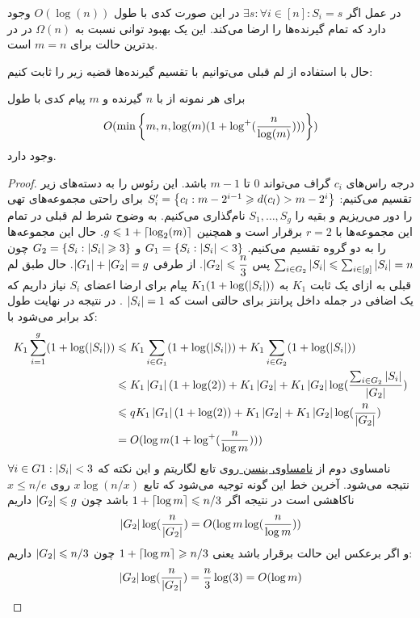 \begin{remark}
    در عمل اگر
    $\exists s: \forall i \in [n]: S_i = s$
    در این صورت کدی با طول
    $O(\log(n))$
    وجود دارد که تمام گیرنده‌ها را ارضا می‌کند. این یک بهبود توانی نسبت به
    $\Omega(n)$
    در
    \icod
    در بدترین حالت برای
    $m = n$
    است.
\end{remark}

حال با استفاده از لم قبلی می‌توانیم با تقسیم گیرنده‌ها قضیه زیر را ثابت کنیم:
\begin{theorem}
    \label{theorem:log1}
    برای هر نمونه از
    با
    $n$
    گیرنده و
    $m$
    پیام کدی با طول
    $$O(\min\left\{ m, n, \log(m)(1 + \log^{+}(\dfrac{n}{\log(m)}) )) \right\})$$
    وجود دارد.
\end{theorem}
\begin{proof}
    درجه راس‌های
    $c_i$
    گراف می‌تواند
    $0$
    تا
    $m - 1$
    باشد. این رئوس را به دسته‌های زیر تقسیم می‌کنیم:
    $S_{i}' = \left\{ c_l: m - 2^{i - 1} \geqslant d(c_l) > m - 2^i \right\}$
    برای راحتی مجموعه‌های تهی را دور می‌ریزیم و بقیه را
    $S_1, \ldots, S_g$
    نام‌گذاری می‌کنیم. به وضوح شرط لم قبلی در تمام این مجموعه‌ها با
    $r = 2$
    برقرار است و همچنین
    $g \leqslant 1 + \left\lceil{\log_2(m)}\right\rceil$. حال این مجموعه‌ها را به دو گروه تقسیم می‌کنیم.
    $G_1 = \left\{  S_i: \left|{S_i}\right| < 3 \right\}$
    و
    $G_2 = \left\{  S_i: \left|{S_i}\right| \geqslant 3 \right\}$
    چون
    $\sum_{i \in G_2} \left|{S_i}\right| \leqslant \sum_{i \in [g]} \left|{S_i}\right| = n$
    پس
    $\left|{G_2}\right| \leqslant \dfrac{n}{3}$. از طرفی
    $\left|{G_1}\right| + \left|{G_2}\right| = g$. حال طبق لم قبلی به ازای یک ثابت
    $K_1$
    به
    $K_1(1 + \log(\left|{S_i}\right|))$
    پیام برای ارضا اعضای
    $S_i$
    نیاز داریم که یک اضافی در جمله داخل پرانتز برای حالتی است که
    $\left|{S_i}\right| = 1$
    . در نتیجه در نهایت طول کد برابر می‌شود با:
    \begin{align}
        K_1 \sum\limits_{i = 1}^{g} (1 + \log(\left|{S_i}\right|))
        & \leqslant K_1 \sum_{i \in G_1}    (1 + \log(\left|{S_i}\right|)) + K_1 \sum_{i \in G_2} (1 + \log(\left|{S_i}\right|)) \\
        & \leqslant K_1 \left|{G_1}\right| (1 + \log(2)) + K_1 \left|{G_2}\right| + K_1 \left|{G_2}\right| \log(\dfrac{\sum_{i\in G_2} \left|{S_i}\right|}{\left|{G_2}\right|}) \\
        & \leqslant q K_1 \left|{G_1}\right| (1 + \log(2)) + K_1 \left|{G_2}\right| + K_1 \left|{G_2}\right| \log(\dfrac{n}{\left|{G_2}\right|}) \\
        & = O(\log m (1 + \log^{+}(\dfrac{n}{\log m})))
    \end{align}
    نامساوی دوم از
    \hyperref[Jensen]{
        نامساوی ینسن
    }
    روی تابع لگاریتم و این نکته که
    $\forall i \in G1: \left|{S_i}\right| < 3$
    نتیجه می‌شود. آخرین خط این گونه توجیه می‌شود که تابع
    $x \log(n/x)$
    روی
    $x \leq n/e$
    ناکاهشی است در نتیجه اگر
    $1 + \left\lceil{ \log m}\right\rceil \leqslant n/3$
    باشد چون
    $\left|{G_2}\right| \leqslant g$
    داریم
    $$\left|{G_2}\right| \log (\dfrac{n}{\left|{G_2}\right|}) = O(\log m \log (\dfrac{n}{\log m}))$$
    و اگر برعکس این حالت برقرار باشد یعنی
    $1 + \left\lceil{ \log m }\right\rceil \geqslant n/3$
    چون
    $\left|{G_2}\right| \leqslant n/3$
    داریم:
    $$\left|{G_2}\right| \log(\dfrac{n}{\left|{G_2}\right|}) = \dfrac{n}{3} \log(3) = O(\log m)$$


\end{proof}
